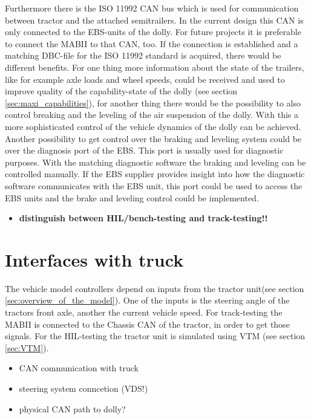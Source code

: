 \documentclass[ExampleMasters.tex]{subfiles}
\begin{document}
	Furthermore there is the ISO 11992 CAN bus which is used for communication between tractor and the attached semitrailers. In the current design this CAN is only connected to the EBS-units of the dolly. For future projects it is preferable to connect the MABII to that CAN, too. If the connection is established and a matching DBC-file for the ISO 11992 standard is acquired, there would be different benefits. For one thing more information about the state of the trailers, like for example axle loads and wheel speeds, could be received and used to improve quality of the capability-state of the dolly (see section \ref{sec:maxi_capabilities}), for another thing there would be the possibility to also control breaking and the leveling of the air suspension of the dolly. With this a more sophisticated control of the vehicle dynamics of the dolly can be achieved.\\
	Another possibility to get control over the braking and leveling system could be over the diagnosis port of the EBS. This port is usually used for diagnostic purposes. With the matching diagnostic software the braking and leveling can be controlled manually. If the EBS supplier provides insight into how the diagnostic software communicates with the EBS unit, this port could be used to access the EBS units and the brake and leveling control could be implemented.
\begin{itemize}	
	\item \textbf{distinguish between HIL/bench-testing and track-testing!!}
\end{itemize}

\section{Interfaces with truck}
\label{sec:interface_with_truck}
The vehicle model controllers depend on inputs from the tractor unit(see section \ref{sec:overview_of_the_model}). One of the inputs is the steering angle of the tractors front axle, another the current vehicle speed. For track-testing the MABII is connected to the Chassis CAN of the tractor, in order to get those signals. For the HIL-testing the tractor unit is simulated using VTM (see section \ref{sec:VTM}).
\begin{itemize}
	\item CAN communication with truck
	\item steering system conncetion (VDS!)
	\item physical CAN path to dolly?

\end{itemize}
\end{document}
